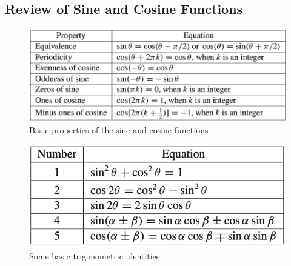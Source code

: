 \subsection{Review of Sine and Cosine Functions}
\begin{figure}[h]
	\centering
	\includegraphics[width=0.7\linewidth]{Figures/DSP_Figures_Lecture1/Basic_Properties_SinCosine}
	\caption{Basic properties of the sine and cosine functions}
	\label{fig:basicpropertiessincosine}
\end{figure}
\begin{figure}[h]
	\centering
	\includegraphics[scale=0.80]{Figures/DSP_Figures_Lecture1/Trigonometric_Identities}
	\caption{Some basic trigonometric identities}
	\label{fig:trigonometric_identities}
\end{figure}
